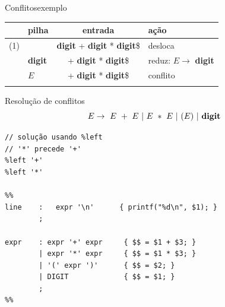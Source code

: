 \begin{frame}{Conflitos}{exemplo}
\centering\small
  \bigskip

  \scriptsize
  \begin{tabular}[h]{r|l|c|l}
    \toprule
    & \hfil pilha & entrada &\hfil ação \\
    \midrule
    (1) &  &\hfill {\bf digit} + {\bf digit} * {\bf digit}\$& desloca \\
    \only<2->{
    (2) &  {\bf digit} &\hfill + {\bf digit} * {\bf digit}\$ & reduz: $E\rightarrow$ {\bf digit} \\
    }
    \only<3->{
    (3) & $E$ &\hfill + {\bf digit} * {\bf digit}\$ & {\large\color{red}conflito} \\
    }
     & & &\\
   \bottomrule
  \end{tabular}
\end{frame}

\begin{frame}[fragile]{Resolução de conflitos}
  $$E \rightarrow\ E\ +\ E\ |\ E\ *\ E\ |\ (E)\ |\ \text{\bf digit} $$

  \small


\begin{lstlisting}
// solução usando %left
// '*' precede '+'
%left '+'
%left '*'

%%
line    :   expr '\n'      { printf("%d\n", $1); }
        ;

expr    : expr '+' expr     { $$ = $1 + $3; }
        | expr '*' expr     { $$ = $1 * $3; }
        | '(' expr ')'      { $$ = $2; }
        | DIGIT             { $$ = $1; }
        ;
%%
\end{lstlisting}
\end{frame}

